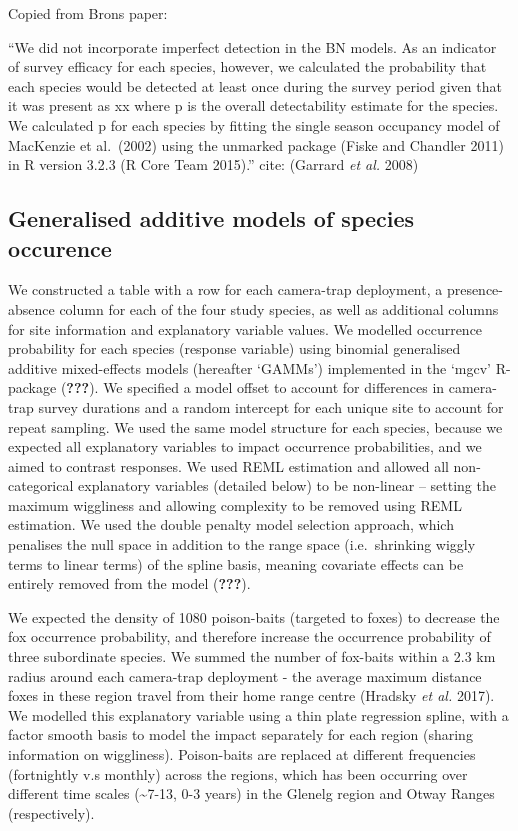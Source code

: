 \documentclass[11pt,a4paper,titlepage,twoside,openright]{style/unimelbthesis}
\begin{document}
\begin{mainmatter}
Copied from Brons paper:

``We did not incorporate imperfect detection in the BN models. As an indicator of survey efficacy for each species, however, we calculated the probability that each species would be detected at least once during the survey period given that it was present as xx where p is the overall detectability estimate for the species. We calculated p for each species by fitting the single season occupancy model of MacKenzie et al.~(2002) using the unmarked package (Fiske and Chandler 2011) in R version 3.2.3 (R Core Team 2015).''
cite: (Garrard \emph{et al.} 2008)

\hypertarget{generalised-additive-models-of-species-occurence}{%
\subsection{Generalised additive models of species occurence}\label{generalised-additive-models-of-species-occurence}}

We constructed a table with a row for each camera-trap deployment, a presence-absence column for each of the four study species, as well as additional columns for site information and explanatory variable values. We modelled occurrence probability for each species (response variable) using binomial generalised additive mixed-effects models (hereafter `GAMMs') implemented in the `mgcv' R-package ({\textbf{???}}). We specified a model offset to account for differences in camera-trap survey durations and a random intercept for each unique site to account for repeat sampling. We used the same model structure for each species, because we expected all explanatory variables to impact occurrence probabilities, and we aimed to contrast responses. We used REML estimation and allowed all non-categorical explanatory variables (detailed below) to be non-linear -- setting the maximum wiggliness and allowing complexity to be removed using REML estimation. We used the double penalty model selection approach, which penalises the null space in addition to the range space (i.e.~shrinking wiggly terms to linear terms) of the spline basis, meaning covariate effects can be entirely removed from the model ({\textbf{???}}).

We expected the density of 1080 poison-baits (targeted to foxes) to decrease the fox occurrence probability, and therefore increase the occurrence probability of three subordinate species. We summed the number of fox-baits within a 2.3 km radius around each camera-trap deployment - the average maximum distance foxes in these region travel from their home range centre (Hradsky \emph{et al.} 2017). We modelled this explanatory variable using a thin plate regression spline, with a factor smooth basis to model the impact separately for each region (sharing information on wiggliness). Poison-baits are replaced at different frequencies (fortnightly v.s monthly) across the regions, which has been occurring over different time scales (\textasciitilde7-13, 0-3 years) in the Glenelg region and Otway Ranges (respectively).


\end{mainmatter}
\end{document}
